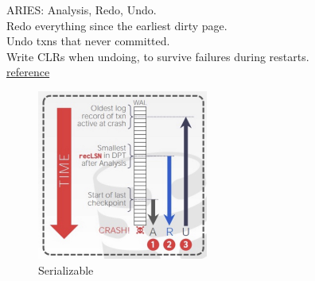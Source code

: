\documentclass[letterpaper,11pt]{exam}
\begin{document}
\begin{spacing}{1.2}
  ARIES: Analysis, Redo, Undo. \\
  Redo everything since the earliest dirty page. \\
  Undo txns that never committed. \\
  Write CLRs when undoing, to survive failures during restarts. \\
  \hyperref{https://zhenghe.gitbook.io/open-courses/cmu-15-445-645-database-systems/database-recovery}{category}{name}{reference}
  \begin{figure}[h]
    \centering
    \includegraphics[width=0.5\textwidth]{../assets/ARIES.jpg}
    \caption{Serializable}
  \end{figure}
  
\end{spacing}
\end{document}
